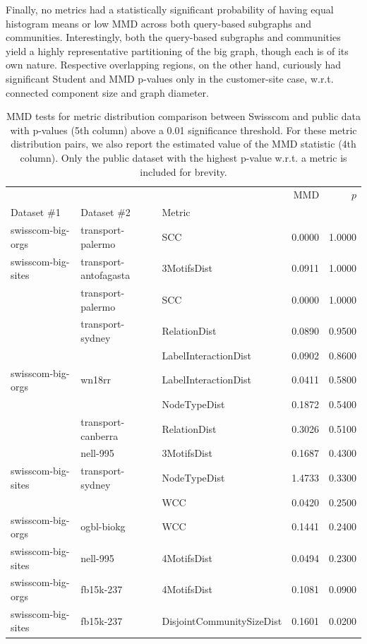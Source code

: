 Finally, no metrics had a statistically significant probability of having equal histogram means or low MMD across both query-based subgraphs and communities. Interestingly, both the query-based subgraphs and communities yield a highly representative partitioning of the big graph, though each is of its own nature. Respective overlapping regions, on the other hand, curiously had significant Student and MMD p-values only in the customer-site case, w.r.t. connected component size and graph diameter.

\begin{table}[H]
    \centering
        \caption[MMD tests for metric distribution comparison between Swisscom and public data.]{MMD tests for metric distribution comparison between Swisscom and public data with p-values (5th column) above a 0.01 significance threshold. For these metric distribution pairs, we also report the estimated value of the MMD statistic (4th column). Only the public dataset with the highest p-value w.r.t. a metric is included for brevity.}
    \label{tab:mmd}
\begin{adjustbox}{width=\columnwidth}
\begin{tabular}{lllrr}
\toprule
                   &           &                           &    MMD &  $p$ \\
Dataset \#1 & Dataset \#2 & Metric &        &            \\
\midrule
swisscom-big-orgs & transport-palermo & SCC & 0.0000 &     1.0000 \\
swisscom-big-sites & transport-antofagasta & 3MotifsDist & 0.0911 &     1.0000 \\
                   & transport-palermo & SCC & 0.0000 &     1.0000 \\
                   & transport-sydney & RelationDist & 0.0890 &     0.9500 \\
                   &           & LabelInteractionDist & 0.0902 &     0.8600 \\
swisscom-big-orgs & wn18rr & LabelInteractionDist & 0.0411 &     0.5800 \\
                   &           & NodeTypeDist & 0.1872 &     0.5400 \\
                   & transport-canberra & RelationDist & 0.3026 &     0.5100 \\
                   & nell-995 & 3MotifsDist & 0.1687 &     0.4300 \\
swisscom-big-sites & transport-sydney & NodeTypeDist & 1.4733 &     0.3300 \\
                   &           & WCC & 0.0420 &     0.2500 \\
swisscom-big-orgs & ogbl-biokg & WCC & 0.1441 &     0.2400 \\
swisscom-big-sites & nell-995 & 4MotifsDist & 0.0494 &     0.2300 \\
swisscom-big-orgs & fb15k-237 & 4MotifsDist & 0.1081 &     0.0900 \\
swisscom-big-sites & fb15k-237 & DisjointCommunitySizeDist & 0.1601 &     0.0200 \\
\bottomrule
\end{tabular}
\end{adjustbox}
\end{table}

